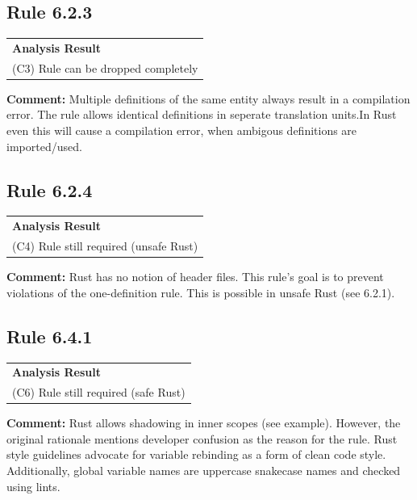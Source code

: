 \subsection*{Rule 6.2.3}
\begin{longtable}{p{13cm}}
\textbf{Analysis Result} \\
(C3) Rule can be dropped completely \\
\end{longtable}
\textbf{Comment:} Multiple definitions of the same entity always result in a compilation error. The rule allows identical definitions in seperate translation units.In Rust even this will cause a compilation error, when ambigous definitions are imported/used. \\


\subsection*{Rule 6.2.4}
\begin{longtable}{p{13cm}}
\textbf{Analysis Result} \\
(C4) Rule still required (unsafe Rust) \\
\end{longtable}
\textbf{Comment:} Rust has no notion of header files. This rule's goal is to prevent violations of the one-definition rule. This is possible in unsafe Rust (see 6.2.1). \\
\subsection*{Rule 6.4.1}
\begin{longtable}{p{13cm}}
\textbf{Analysis Result} \\
(C6) Rule still required (safe Rust) \\
\end{longtable}
\textbf{Comment:} Rust allows shadowing in inner scopes (see example). However, the original rationale mentions developer confusion as the reason for the rule. Rust style guidelines advocate for variable rebinding as a form of clean code style. Additionally, global variable names are uppercase snakecase names and checked using lints. \\


